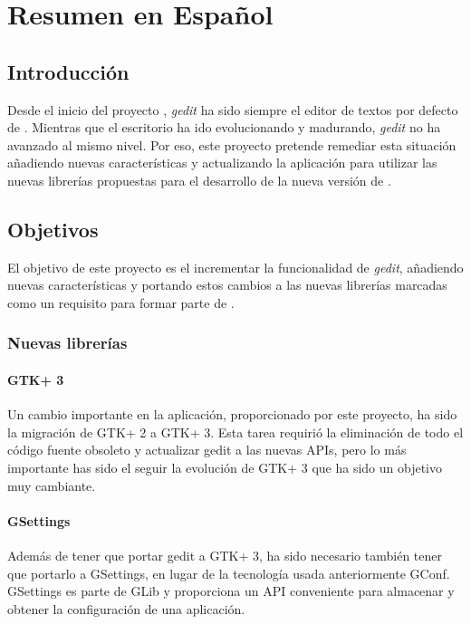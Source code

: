 
\chapter{Resumen en Español}

\section{Introducción}

Desde el inicio del proyecto \GNOME, \emph{gedit} ha sido siempre el editor
de textos por defecto de \GNOME. Mientras que el escritorio ha ido evolucionando
y madurando, \emph{gedit} no ha avanzado al mismo nivel. Por eso, este proyecto
pretende remediar esta situación añadiendo nuevas características y actualizando
la aplicación para utilizar las nuevas librerías propuestas para el desarrollo
de la nueva versión de \GNOME.

\section{Objetivos}

El objetivo de este proyecto es el incrementar la funcionalidad de \emph{gedit},
añadiendo nuevas características y portando estos cambios a las nuevas librerías
marcadas como un requisito para formar parte de .

\subsection{Nuevas librerías}

\subsubsection{GTK+ 3}

Un cambio importante en la aplicación, proporcionado por este proyecto, ha sido
la migración de GTK+ 2 a GTK+ 3. Esta tarea requirió la eliminación de todo el
código fuente obsoleto y actualizar gedit a las nuevas APIs, pero lo más importante
has sido el seguir la evolución de GTK+ 3 que ha sido un objetivo muy cambiante.

\subsubsection{GSettings}

Además de tener que portar gedit a GTK+ 3, ha sido necesario también tener que
portarlo a GSettings, en lugar de la tecnología usada anteriormente GConf.
GSettings es parte de GLib y proporciona un API conveniente para almacenar y
obtener la configuración de una aplicación.

